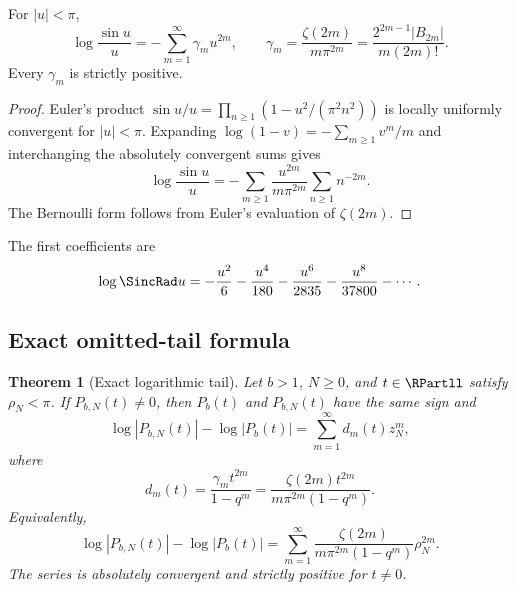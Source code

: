 \documentclass[11pt]{article}
\numberwithin{equation}{section}
\newtheorem{theorem}{Theorem}[section]
\theoremstyle{definition}
\theoremstyle{remark}
\begin{document}
\begin{lemma}
\label{p8:lem:logsinc}
For $|u|<\pi$,
\begin{equation}
\log\frac{\sin u}{u}
=-\sum_{m=1}^{\infty}\gamma_m u^{2m},
\qquad
\gamma_m=\frac{\zeta(2m)}{m\pi^{2m}}
=\frac{2^{2m-1}|B_{2m}|}{m(2m)!}.
\label{p8:eq:logsinc}
\end{equation}
Every $\gamma_m$ is strictly positive.
\end{lemma}

\begin{proof}
Euler's product
\(
\sin u/u=\prod_{n\ge1}(1-u^2/(\pi^2n^2))
\)
is locally uniformly convergent for $|u|<\pi$. Expanding $\log(1-v)=-\sum_{m\ge1}v^m/m$ and interchanging the absolutely convergent sums gives
\[
\log\frac{\sin u}{u}
=-\sum_{m\ge1}\frac{u^{2m}}{m\pi^{2m}}
\sum_{n\ge1}n^{-2m}.
\]
The Bernoulli form follows from Euler's evaluation of $\zeta(2m)$.
\end{proof}

The first coefficients are
\begin{equation}
\log\SincRad u=-\frac{u^2}{6}-\frac{u^4}{180}
-\frac{u^6}{2835}-\frac{u^8}{37800}-\cdots.
\label{p8:eq:logsinc-first}
\end{equation}

\subsection{Exact omitted-tail formula}

\begin{theorem}[Exact logarithmic tail]
\label{p8:thm:exact-tail}
Let $b>1$, $N\ge0$, and $t\in\RPartll$ satisfy $\rho_N<\pi$. If $P_{b,N}(t)\ne0$, then $P_b(t)$ and $P_{b,N}(t)$ have the same sign and
\begin{equation}
\log|P_{b,N}(t)|-\log|P_b(t)|
=\sum_{m=1}^{\infty}d_m(t)z_N^m,
\label{p8:eq:tail-z}
\end{equation}
where
\begin{equation}
d_m(t)=\frac{\gamma_m t^{2m}}{1-q^m}
=\frac{\zeta(2m)t^{2m}}{m\pi^{2m}(1-q^m)}.
\label{p8:eq:dm}
\end{equation}
Equivalently,
\begin{equation}
\log|P_{b,N}(t)|-\log|P_b(t)|
=\sum_{m=1}^{\infty}
\frac{\zeta(2m)}{m\pi^{2m}(1-q^m)}\rho_N^{2m}.
\label{p8:eq:tail-rho}
\end{equation}
The series is absolutely convergent and strictly positive for $t\ne0$.
\end{theorem}
\end{document}
